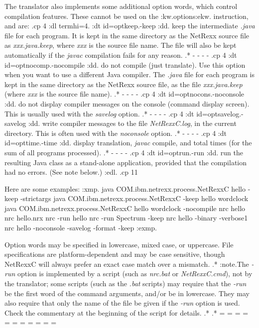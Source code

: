 The translator also implements some additional option words, which
control compilation features.  These cannot be used on the
:kw.options:ekw. instruction, and are:
.cp 4
:dl termhi=4.
:dt id=optkeep.-keep
:dd.
keep the intermediate \emph{.java} file for each program.  It is kept in
the same directory as the NetRexx source file as \emph{xxx.java.keep},
where \emph{xxx} is the source file name.  The file will also be kept
automatically if the \emph{javac} compilation fails for any reason.
.* - - - -
.cp 4
:dt id=optnocomp.-nocompile
:dd.
do not compile (just translate).  Use this option when you want to use a
different Java compiler.  The \emph{.java} file for each program is kept
in the same directory as the NetRexx source file, as the
file \emph{xxx.java.keep} (where \emph{xxx} is the source file name).
.* - - - -
.cp 4
:dt id=optnocons.-noconsole
:dd.
do not display compiler messages on the console (command display
screen).  This is usually used with the \emph{savelog} option.
.* - - - -
.cp 4
:dt id=optsavelog.-savelog
:dd.
write compiler messages to the file \emph{NetRexxC.log}, in the current
directory.
This is often used with the \emph{noconsole} option.
.* - - - -
.cp 4
:dt id=opttime.-time
:dd.
display translation, \emph{javac} compile, and total times (for the sum
of all programs processed).
.* - - - -
.cp 4
:dt id=optrun.-run
:dd.
run the resulting Java class as a stand-alone application, provided that
the compilation had no errors.
(See note below.)
:edl.
.cp 11

Here are some examples:
:xmp.
java COM.ibm.netrexx.process.NetRexxC hello -keep -strictargs
java COM.ibm.netrexx.process.NetRexxC -keep hello wordclock
java COM.ibm.netrexx.process.NetRexxC hello wordclock -nocompile
nrc hello
nrc hello.nrx
nrc -run hello
nrc -run Spectrum -keep
nrc hello -binary -verbose1
nrc hello -noconsole -savelog -format -keep
:exmp.

Option words may be specified in lowercase, mixed case, or uppercase.
File specifications are platform-dependent and may be case sensitive,
though NetRexxC will always prefer an exact case match over a mismatch.
.*
:note.The \emph{-run} option is implemented by a script (such
as \emph{nrc.bat} or \emph{NetRexxC.cmd}), not by the translator; some
scripts (such as the \emph{.bat} scripts) may require that
the \emph{-run} be the first word of the command arguments, and/or be in
lowercase.  They may also require that only the name of the file be
given if the \emph{-run} option is used.  Check the commentary at the
beginning of the script for details.
.*
.* = = = = = = = = = = =
